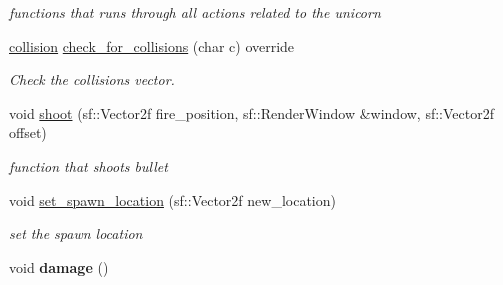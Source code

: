 \begin{DoxyCompactItemize}
\begin{DoxyCompactList}\small\item\em functions that runs through all actions related to the unicorn \end{DoxyCompactList}\item 
\hyperlink{structcollision}{collision} \hyperlink{classunicorn_a40fe782f273abf46f6121db9aa4bf77a}{check\+\_\+for\+\_\+collisions} (char c) override
\begin{DoxyCompactList}\small\item\em Check the collisions vector. \end{DoxyCompactList}\item 
void \hyperlink{classunicorn_af448a3fa5fc5f09254b50afa151ce42b}{shoot} (sf\+::\+Vector2f fire\+\_\+position, sf\+::\+Render\+Window \&window, sf\+::\+Vector2f offset)
\begin{DoxyCompactList}\small\item\em function that shoots bullet \end{DoxyCompactList}\item 
void \hyperlink{classunicorn_af0e2581c426b4b1e32f8a7b484b4e242}{set\+\_\+spawn\+\_\+location} (sf\+::\+Vector2f new\+\_\+location)
\begin{DoxyCompactList}\small\item\em set the spawn location \end{DoxyCompactList}\item 
\mbox{\label{classunicorn_a5be2c0f1caeeb479fee748ee9ddfe864}} 
void {\bfseries damage} ()
\end{DoxyCompactItemize}
